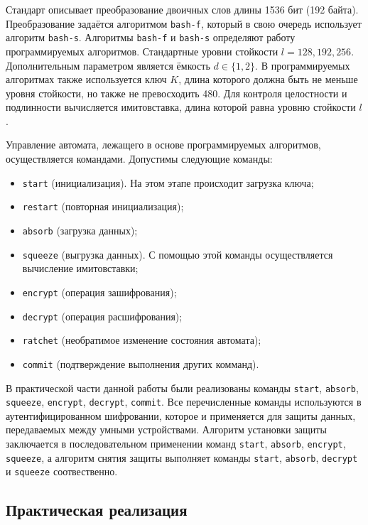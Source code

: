 	Стандарт описывает преобразование двоичных слов длины 1536 бит (192 байта). Преобразование
	задаётся алгоритмом \texttt{bash-f}, который в свою очередь использует алгоритм \texttt{bash-s}. 
	Алгоритмы \texttt{bash-f} и \texttt{bash-s} определяют работу программируемых алгоритмов. Стандартные уровни
	стойкости $l = 128, 192, 256$. Дополнительным параметром является ёмкость $d \in \{1, 2\}$.
	В программируемых алгоритмах также используется ключ $K$, длина которого должна быть не меньше 
	уровня стойкости, но также не превосходить 480. Для контроля целостности и подлинности вычисляется
	имитовставка, длина которой равна уровню стойкости $l$.
	
	Управление автомата, лежащего в основе программируемых алгоритмов, осуществляется командами.
	Допустимы следующие команды:
	
	\begin{itemize}
		\item \texttt{start} (инициализация). На этом этапе происходит загрузка ключа;
		\item \texttt{restart} (повторная инициализация);
		\item \texttt{absorb} (загрузка данных);
		\item \texttt{squeeze} (выгрузка данных). С помощью этой команды осуществляется вычисление имитовставки;
		\item \texttt{encrypt} (операция зашифрования);
		\item \texttt{decrypt} (операция расшифрования);
		\item \texttt{ratchet} (необратимое изменение состояния автомата);
		\item \texttt{commit} (подтверждение выполнения других комманд).
	\end{itemize}

	В практической части данной работы были реализованы команды \texttt{start}, \texttt{absorb}, \texttt{squeeze}, \texttt{encrypt}, 
	\texttt{decrypt}, \texttt{commit}. Все перечисленные команды используются в аутентифицированном шифровании,
	которое и применяется для защиты данных, передаваемых между умными устройствами. Алгоритм
	установки защиты заключается в последовательном применении команд \texttt{start}, \texttt{absorb}, \texttt{encrypt}, \texttt{squeeze},
	а алгоритм снятия защиты выполняет команды \texttt{start}, \texttt{absorb}, \texttt{decrypt} и \texttt{squeeze} соотвественно.
	
	\subsection{Практическая реализация}
	
